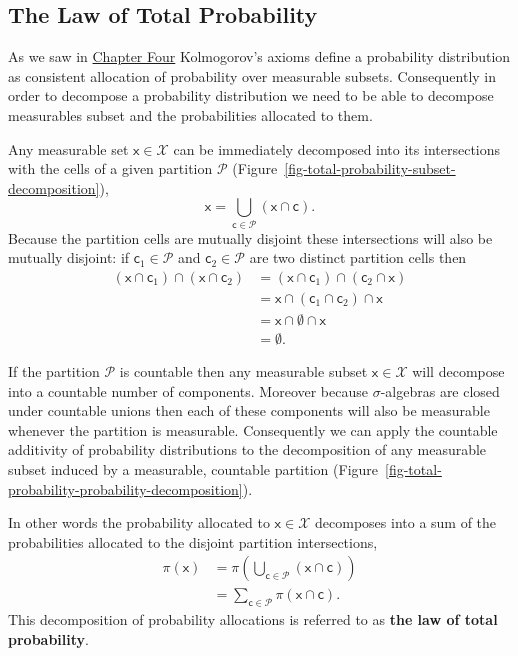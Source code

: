 \documentclass[
  letterpaper,
  DIV=11,
  numbers=noendperiod]{scrartcl}
\begin{document}
\subsection{The Law of Total
Probability}\label{the-law-of-total-probability}

As we saw in
\href{https://betanalpha.github.io/assets/chapters_html/probability_on_general_spaces.html}{Chapter
Four} Kolmogorov's axioms define a probability distribution as
consistent allocation of probability over measurable subsets.
Consequently in order to decompose a probability distribution we need to
be able to decompose measurables subset and the probabilities allocated
to them.

Any measurable set \(\mathsf{x} \in \mathcal{X}\) can be immediately
decomposed into its intersections with the cells of a given partition
\(\mathcal{P}\)
(Figure~\ref{fig-total-probability-subset-decomposition}), \[
\mathsf{x}
=
\bigcup_{\mathsf{c} \in \mathcal{P}}
\left( \mathsf{x} \cap \mathsf{c} \right).
\] Because the partition cells are mutually disjoint these intersections
will also be mutually disjoint: if \(\mathsf{c}_{1} \in \mathcal{P}\)
and \(\mathsf{c}_{2} \in \mathcal{P}\) are two distinct partition cells
then \begin{align*}
( \mathsf{x} \cap \mathsf{c}_{1} ) \cap ( \mathsf{x} \cap \mathsf{c}_{2} )
&=
( \mathsf{x} \cap \mathsf{c}_{1} ) \cap ( \mathsf{c}_{2} \cap \mathsf{x}  )
\\
&=
\mathsf{x} \cap ( \mathsf{c}_{1} \cap \mathsf{c}_{2} ) \cap \mathsf{x}
\\
&=
\mathsf{x} \cap \emptyset \cap \mathsf{x}
\\
&= \emptyset.
\end{align*}

If the partition \(\mathcal{P}\) is countable then any measurable subset
\(\mathsf{x} \in \mathcal{X}\) will decompose into a countable number of
components. Moreover because \(\sigma\)-algebras are closed under
countable unions then each of these components will also be measurable
whenever the partition is measurable. Consequently we can apply the
countable additivity of probability distributions to the decomposition
of any measurable subset induced by a measurable, countable partition
(Figure~\ref{fig-total-probability-probability-decomposition}).

In other words the probability allocated to
\(\mathsf{x} \in \mathcal{X}\) decomposes into a sum of the
probabilities allocated to the disjoint partition intersections,
\begin{align*}
\pi(\mathsf{x})
&=
\pi \left( \bigcup_{\mathsf{c} \in \mathcal{P}}
           \left( \mathsf{x} \cap \mathsf{c} \right) \right)
\\
&=
\sum_{\mathsf{c} \in \mathcal{P}} \pi( \mathsf{x} \cap \mathsf{c} ).
\end{align*} This decomposition of probability allocations is referred
to as \textbf{the law of total probability}.
\end{document}
